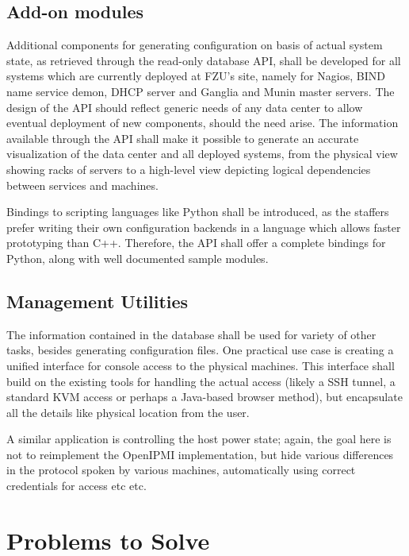 \documentclass{article}
\begin{document}
\subsection{Add-on modules}

Additional components for generating configuration on basis of actual system state, as retrieved through the
read-only database API, shall be developed for all systems which are currently deployed at FZU's site, namely for Nagios, BIND
name service demon, DHCP server and Ganglia and Munin master servers.  The design of the API should reflect generic needs of any
data center to allow eventual deployment of new components, should the need arise.  The information available through the API
shall make it possible to generate an accurate visualization of the data center and all deployed systems, from the physical view
showing racks of servers to a high-level view depicting logical dependencies between services and machines.

Bindings to scripting languages like Python shall be introduced, as the staffers prefer writing their own configuration backends
in a language which allows faster prototyping than C++.  Therefore, the API shall offer a complete bindings for Python, along with
well documented sample modules.

\subsection{Management Utilities}

The information contained in the database shall be used for variety of other tasks, besides generating configuration files.  One
practical use case is creating a unified interface for console access to the physical machines.  This interface shall build on the
existing tools for handling the actual access (likely a SSH tunnel, a standard KVM access or perhaps a Java-based browser method),
but encapsulate all the details like physical location from the user.

A similar application is controlling the host power state; again, the goal here is not to reimplement the OpenIPMI implementation,
but hide various differences in the protocol spoken by various machines, automatically using correct credentials for access etc
etc.

\section{Problems to Solve}
\end{document}
